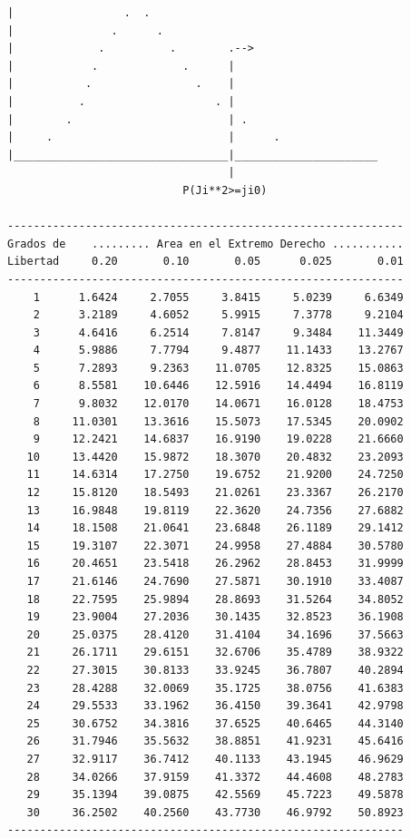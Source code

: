 \begin{verbatim}
|                 .  .
|               .      .
|             .          .        .-->
|            .             .      |
|           .                .    |
|          .                    . |
|        .                        | .
|     .                           |      .
|_________________________________|______________________
                                  |
                           P(Ji**2>=ji0)

-------------------------------------------------------------
Grados de    ......... Area en el Extremo Derecho ...........
Libertad     0.20       0.10       0.05      0.025       0.01
-------------------------------------------------------------
    1      1.6424     2.7055     3.8415     5.0239     6.6349
    2      3.2189     4.6052     5.9915     7.3778     9.2104
    3      4.6416     6.2514     7.8147     9.3484    11.3449
    4      5.9886     7.7794     9.4877    11.1433    13.2767
    5      7.2893     9.2363    11.0705    12.8325    15.0863
    6      8.5581    10.6446    12.5916    14.4494    16.8119
    7      9.8032    12.0170    14.0671    16.0128    18.4753
    8     11.0301    13.3616    15.5073    17.5345    20.0902
    9     12.2421    14.6837    16.9190    19.0228    21.6660
   10     13.4420    15.9872    18.3070    20.4832    23.2093
   11     14.6314    17.2750    19.6752    21.9200    24.7250
   12     15.8120    18.5493    21.0261    23.3367    26.2170
   13     16.9848    19.8119    22.3620    24.7356    27.6882
   14     18.1508    21.0641    23.6848    26.1189    29.1412
   15     19.3107    22.3071    24.9958    27.4884    30.5780
   16     20.4651    23.5418    26.2962    28.8453    31.9999
   17     21.6146    24.7690    27.5871    30.1910    33.4087
   18     22.7595    25.9894    28.8693    31.5264    34.8052
   19     23.9004    27.2036    30.1435    32.8523    36.1908
   20     25.0375    28.4120    31.4104    34.1696    37.5663
   21     26.1711    29.6151    32.6706    35.4789    38.9322
   22     27.3015    30.8133    33.9245    36.7807    40.2894
   23     28.4288    32.0069    35.1725    38.0756    41.6383
   24     29.5533    33.1962    36.4150    39.3641    42.9798
   25     30.6752    34.3816    37.6525    40.6465    44.3140
   26     31.7946    35.5632    38.8851    41.9231    45.6416
   27     32.9117    36.7412    40.1133    43.1945    46.9629
   28     34.0266    37.9159    41.3372    44.4608    48.2783
   29     35.1394    39.0875    42.5569    45.7223    49.5878
   30     36.2502    40.2560    43.7730    46.9792    50.8923
-------------------------------------------------------------






\end{verbatim}
